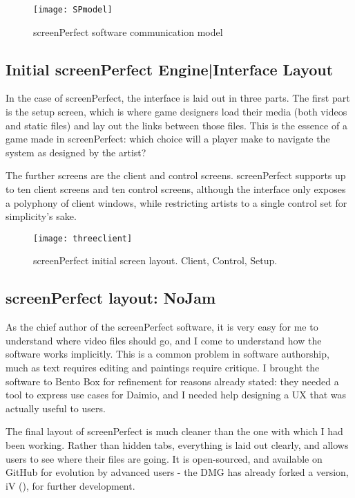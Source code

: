 \begin{figure}[h]
  \caption{screenPerfect software communication model}
  \centering
    \texttt{[image: SPmodel]}
\end{figure}


\subsection{Initial screenPerfect Engine|Interface Layout}
In the case of screenPerfect, the interface is laid out in three parts. The first part is the setup screen, which is where game designers load their media (both videos and static files) and lay out the links between those files. This is the essence of a game made in screenPerfect: which choice will a player make to navigate the system as designed by the artist?

The further screens are the client and control screens. screenPerfect supports up to ten client screens and ten control screens, although the interface only exposes a polyphony of client windows, while restricting artists to a single control set for simplicity's sake.

\begin{figure}[h]
  \caption{screenPerfect initial screen layout. Client, Control, Setup.}
  \centering
    \texttt{[image: threeclient]}
\end{figure}

\subsection{screenPerfect layout: NoJam}

As the chief author of the screenPerfect software, it is very easy for me to understand where video files should go, and I come to understand how the software works implicitly. This is a common problem in software authorship, much as text requires editing and paintings require critique. I brought the software to Bento Box for refinement for reasons already stated: they needed a tool to express use cases for Daimio, and I needed help designing a UX that was actually useful to users.

The final layout of screenPerfect is much cleaner than the one with which I had been working. Rather than hidden tabs, everything is laid out clearly, and allows users to see where their files are going. It is open-sourced, and available on GitHub for evolution by advanced users - the DMG has already forked a version, iV (\cite{iv}), for further development.

